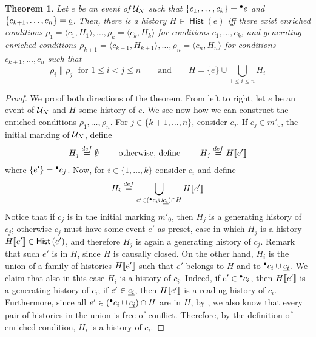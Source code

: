 \documentclass[12pt,a4paper]{article}
\newtheorem{theorem}{Theorem}
\newcommand{\hist}[1]{\ensuremath{\mathop{\mathsf{Hist}}{(#1)}}}
\begin{document}
\begin{theorem}
\label{thm:any.event}
Let $e$ be an event of $\mathcal{U}_{N}$ such that $\{c_1, \ldots, c_k\} = {}^\bullet e$ and
$\{c_{k+1}, \ldots, c_n\} = \underline{e}$.  Then, there is a history $H \in \hist e$
iff there exist enriched conditions $\rho_1 = \langle c_1, H_1 \rangle, \ldots,
\rho_k = \langle c_k, H_k \rangle$ for conditions $c_1, \ldots, c_k$, and
generating enriched conditions $\rho_{k+1} = \langle c_{k+1}, H_{k+1} \rangle,
\ldots, \rho_n = \langle c_n, H_n \rangle$ for conditions $c_{k+1}, \ldots,
c_n$ such that $$\rho_i \parallel \rho_j \; \mbox{ for } 1 \le i < j \le n
\qquad \mbox{and} \qquad H = \{e\} \cup \bigcup_{1 \le i \le n} H_i$$
\end{theorem}

\begin{proof}
We proof both directions of the theorem.  From left to right, let $e$ be an
event of $\mathcal{U}_{N}$ and $H$ some history of $e$.  We see now how we can construct
the enriched conditions $\rho_1, \ldots, \rho_n$.  For $j \in \{k+1, \ldots,
n\}$, consider $c_j$.  If $c_j \in m'_0$, the initial marking of $\mathcal{U}_{N}$,
define $$H_j \stackrel{def}{=} \emptyset \qquad \mbox{ otherwise, define } \qquad H_j
\stackrel{def}{=} H [\![ e']\!]$$
where $\{e'\} = {}^\bullet c_j$.  Now, for $i \in \{1, \ldots, k\}$ consider $c_i$
and define $$H_i \stackrel{def}{=} \bigcup_{e' \in ({}^\bullet c_i \cup \underline{c_i}) \cap H} H
[\![ e']\!]$$ Notice that if $c_j$ is in the initial marking $m'_0$, then $H_j$ is
a generating history of $c_j$; otherwise $c_j$ must have some event $e'$ as
preset, case in which $H_j$ is a history $H\sem{e'} \in \hist{e'}$, and
therefore $H_j$ is again a generating history of $c_j$.  Remark that such $e'$
is in $H$, since $H$ is causally closed.  On the other hand, $H_i$ is the union
of a family of histories $H[\![ e']\!]$ such that $e'$ belongs to $H$ and to
${}^\bullet c_i \cup \underline{c_i}$.  We claim that also in this case $H_i$ is a
history of $c_i$.  Indeed, if $e' \in {}^\bullet c_i$, then $H[\![ e']\!]$ is a
generating history of $c_i$; if $e' \in \underline{c_i}$, then $H[\![ e']\!]$ is a
reading history of $c_i$.  Furthermore, since all $e' \in ({}^\bullet c_i \cup
\underline{c_i}) \cap H$ are in $H$, by , we also know that every pair
of histories in the union is free of conflict.  Therefore, by the definition of
enriched condition, $H_i$ is a history of $c_i$.


\end{proof}
\end{document}
